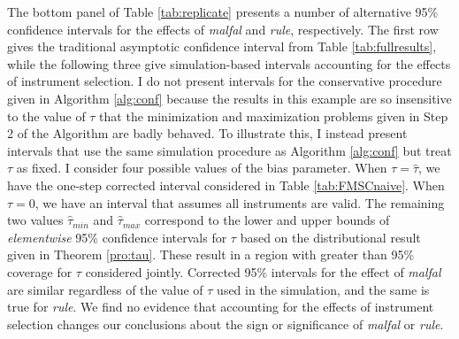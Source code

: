 \documentclass[12pt]{article}
\theoremstyle{definition}
\begin{document}
The bottom panel of Table \ref{tab:replicate} presents a number of alternative 95\% confidence intervals for the effects of \emph{malfal} and \emph{rule}, respectively. The first row gives the traditional asymptotic confidence interval from Table \ref{tab:fullresults}, while the following three give simulation-based intervals accounting for the effects of instrument selection. I do not present intervals for the conservative procedure given in Algorithm \ref{alg:conf} because the results in this example are so insensitive to the value of $\tau$ that the minimization and maximization problems given in Step 2 of the Algorithm are badly behaved. To illustrate this, I instead present intervals that use the same simulation procedure as Algorithm \ref{alg:conf} but treat $\tau$ as fixed. I consider four possible values of the bias parameter. When $\tau = \widehat{\tau}$, we have the one-step corrected interval considered in Table \ref{tab:FMSCnaive}. When $\tau = 0$, we have an interval that assumes all instruments are valid. The remaining two values $\widehat{\tau}_{min}$ and $\widehat{\tau}_{max}$ correspond to the lower and upper bounds of \emph{elementwise} 95\% confidence intervals for $\tau$ based on the distributional result given in Theorem \ref{pro:tau}. These result in a region with greater than 95\% coverage for $\tau$ considered jointly. Corrected 95\% intervals for the effect of \emph{malfal} are similar regardless of the value of $\tau$ used in the simulation, and the same is true for \emph{rule}. We find no evidence that accounting for the effects of instrument selection changes our conclusions about the sign or significance of \emph{malfal} or \emph{rule}.
\end{document}
